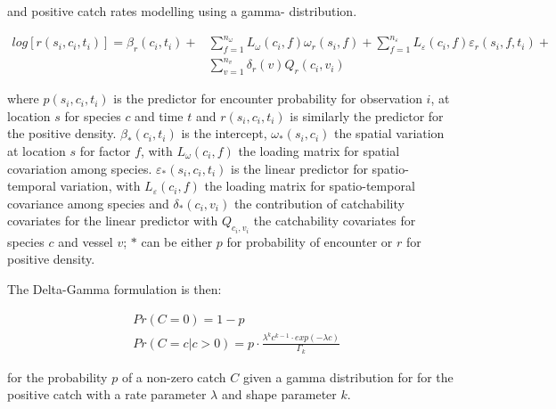 \documentclass[12pt]{article}
\begin{document}
\begin{linenumbers}
and positive catch rates modelling using a gamma- distribution\cite{Thorson2015a}.

		\begin{equation}
			\begin{split}
			log[r(s_{i},c_{i},t_{i})] = \beta_{r}(c_{i},t_{i}) +
			& \sum\limits_{f=1}^{n_{\omega}} L_{\omega}(c_{i},f)
			\omega_{r}(s_{i},f) +\sum\limits_{f=1}^{n_{\varepsilon}} 
			L_{\varepsilon}(c_{i},f) \varepsilon_{r}(s_{i},f,t_{i}) + \\
			& \sum\limits_{v=1}^{n_{v}}\delta_{r}(v) Q_{r}(c_{i}, v_{i})
			\end{split}
		\end{equation}

where $p(s_{i}, c_{i}, t_{i})$ is the predictor for encounter probability for
observation $i$, at location $s$ for species $c$ and time $t$ and $r(s_{i},
c_{i}, t_{i})$ is similarly the predictor for the positive density.
$\beta_{*}(c_{i},t_{i})$ is the intercept, $\omega_{*}(s_{i},c_{i})$ the
spatial variation at location $s$ for factor $f$, with $L_{\omega}(c_{i},f)$
the loading matrix for spatial covariation among species.
$\varepsilon_{*}(s_{i},c_{i},t_{i})$ is the linear predictor for
spatio-temporal variation, with $L_{\varepsilon}(c_{i}, f)$ the loading matrix
for spatio-temporal covariance among species and $\delta_{*}(c_{i}, v_{i})$ the
contribution of catchability covariates for the linear predictor with
$Q_{c_{i}, v_{i}}$ the catchability covariates for species $c$ and vessel $v$;
$*$ can be either $p$ for probability of encounter or $r$ for positive density.

The Delta-Gamma formulation is then:

\begin{equation}
	\begin{split}
	& Pr(C = 0) = 1 - p \\
	& Pr(C = c | c > 0) = p \cdot \frac{\lambda^{k}c^{k-1} \cdot exp(-\lambda c)}{\Gamma_{k}}
	\end{split}
\end{equation}

for the probability $p$ of a non-zero catch $C$ given a gamma distribution for
for the positive catch with a rate parameter $\lambda$ and shape parameter $k$.


\end{linenumbers}
\end{document}
